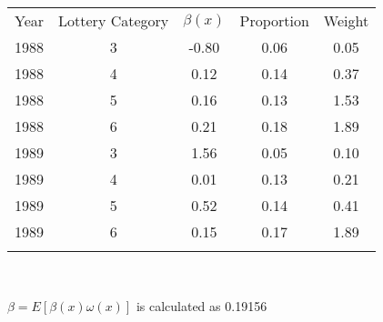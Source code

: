 \begin{center}
\begin{tabular}{ccccc}
\hline \noalign{\smallskip}Year & Lottery Category & $\beta(x)$ & Proportion & Weight\\
\noalign{\smallskip}\hline \noalign{\smallskip}1988 & 3 & -0.80 & 0.06 & 0.05\\
1988 & 4 & 0.12 & 0.14 & 0.37\\
1988 & 5 & 0.16 & 0.13 & 1.53\\
1988 & 6 & 0.21 & 0.18 & 1.89\\
1989 & 3 & 1.56 & 0.05 & 0.10\\
1989 & 4 & 0.01 & 0.13 & 0.21\\
1989 & 5 & 0.52 & 0.14 & 0.41\\
1989 & 6 & 0.15 & 0.17 & 1.89\\
\noalign{\smallskip}\hline\end{tabular}\\
\begin{footnotesize}$\beta=E[\beta(x)\omega(x)]$ is calculated as 0.19156\end{footnotesize}\\
\smallskip
\end{center}
